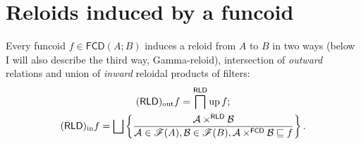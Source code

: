 \section{Reloids induced by a funcoid}

Every funcoid $f\in\mathsf{FCD}(A;B)$
induces a reloid from $A$ to $B$ in two ways (below I will also describe the third way, Gamma-reloid), intersection of \emph{outward}
relations and union of \emph{inward} reloidal products of filters:
\begin{gather*}
\torldout f=\bigsqcap^{\mathsf{RLD}}\up f;\\
\torldin f=\bigsqcup\setcond{\mathcal{A}\times^{\mathsf{RLD}}\mathcal{B}}{\mathcal{A}\in\mathscr{F}(A),\mathcal{B}\in\mathscr{F}(B),\mathcal{A}\times^{\mathsf{FCD}}\mathcal{B}\sqsubseteq f}.
\end{gather*}

